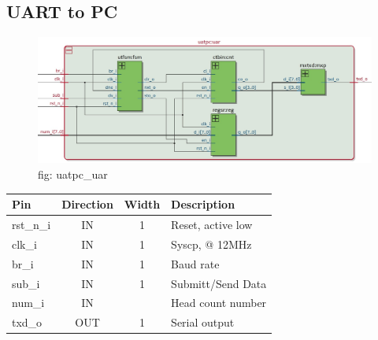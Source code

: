 \documentclass[12pt,a4 paper] {report}
\begin{document}
\subsection{UART to PC}
\begin{figure}[h]
	\centering	
	\includegraphics[scale=0.3]{../png/uatpc_uar.png}
	\newline
	fig: uatpc\_uar\\
\end{figure}
\begin{center}
	\begin{tabular}{ | p{2cm} | c | c | p{5cm} |}
		\hline
		\textbf{Pin} & \textbf{Direction} & \textbf{Width} & \textbf{Description} \\
		\hline	
  	rst\_n\_i & IN & 1 & Reset, active low\\
  	\hline
		clk\_i & IN & 1 & Syscp, @ 12MHz \\
		\hline
		br\_i & IN & 1 & Baud rate \\
		\hline
		sub\_i & IN & 1 & Submitt/Send Data \\
		\hline
		num\_i & IN &  & Head count number \\
		\hline
		txd\_o & OUT & 1 & Serial output \\
		\hline
	\end{tabular}
\end{center}

\newpage
\end{document}
